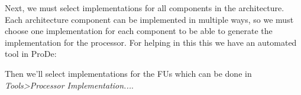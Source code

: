 \documentclass[twoside]{tceusermanual}
\begin{document}
% 
% 
% 
% 
% 

Next, we must select implementations for all components in the architecture.
Each architecture component can be implemented in multiple ways, so we must
choose one implementation for each component to be able to generate the
implementation for the processor. For helping in this this we have an automated
tool in ProDe:




Then we'll select implementations for the FUs which can be done in
\textit{Tools>Processor Implementation...}. 
\end{document}
